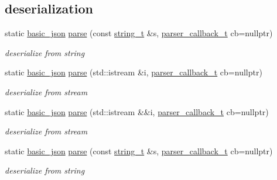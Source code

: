 \subsection*{deserialization}
\begin{DoxyCompactItemize}
\item 
static \hyperlink{classnlohmann_1_1basic__json}{basic\-\_\-json} \hyperlink{classnlohmann_1_1basic__json_a35303ad045a06c2a79dc28ac29652e86}{parse} (const \hyperlink{classnlohmann_1_1basic__json_ab63e618bbb0371042b1bec17f5891f42}{string\-\_\-t} \&s, \hyperlink{classnlohmann_1_1basic__json_a9e35475e2027520a78e09f460dbe048a}{parser\-\_\-callback\-\_\-t} cb=nullptr)
\begin{DoxyCompactList}\small\item\em deserialize from string \end{DoxyCompactList}\item 
static \hyperlink{classnlohmann_1_1basic__json}{basic\-\_\-json} \hyperlink{classnlohmann_1_1basic__json_a13c4d2ab4e7ee2f92be785a7b12948ff}{parse} (std\-::istream \&i, \hyperlink{classnlohmann_1_1basic__json_a9e35475e2027520a78e09f460dbe048a}{parser\-\_\-callback\-\_\-t} cb=nullptr)
\begin{DoxyCompactList}\small\item\em deserialize from stream \end{DoxyCompactList}\item 
static \hyperlink{classnlohmann_1_1basic__json}{basic\-\_\-json} \hyperlink{classnlohmann_1_1basic__json_ab81f2801779e6cb9d98770860af2e39a}{parse} (std\-::istream \&\&i, \hyperlink{classnlohmann_1_1basic__json_a9e35475e2027520a78e09f460dbe048a}{parser\-\_\-callback\-\_\-t} cb=nullptr)
\begin{DoxyCompactList}\small\item\em deserialize from stream \end{DoxyCompactList}\item 
static \hyperlink{classnlohmann_1_1basic__json}{basic\-\_\-json} \hyperlink{classnlohmann_1_1basic__json_a35303ad045a06c2a79dc28ac29652e86}{parse} (const \hyperlink{classnlohmann_1_1basic__json_ab63e618bbb0371042b1bec17f5891f42}{string\-\_\-t} \&s, \hyperlink{classnlohmann_1_1basic__json_a9e35475e2027520a78e09f460dbe048a}{parser\-\_\-callback\-\_\-t} cb=nullptr)
\begin{DoxyCompactList}\small\item\em deserialize from string \end{DoxyCompactList}\item 

\end{DoxyCompactItemize}
